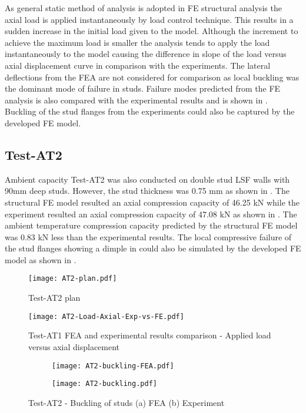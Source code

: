 As general static method of analysis is adopted in FE structural analysis the axial load is applied instantaneously by load control technique. This results in a sudden increase in the initial load given to the model. Although the increment to achieve the maximum load is smaller the analysis tends to apply the load instantaneously to the model causing the difference in slope of the load versus axial displacement curve in comparison with the experiments. The lateral deflections from the FEA are not considered for comparison as local buckling was the dominant mode of failure in studs. Failure modes predicted from the FE analysis is also compared with the experimental results and is shown in . Buckling of the stud flanges from the experiments could also be captured by the developed FE model.

\subsection*{Test-AT2}

Ambient capacity Test-AT2 was also conducted on double stud LSF walls with 90mm deep studs. However, the stud thickness was 0.75 mm as shown in . The structural FE model resulted an axial compression capacity of 46.25 kN while the experiment resulted an axial compression capacity of 47.08 kN as shown in . The ambient temperature compression capacity predicted by the structural FE model was 0.83 kN less than the experimental results. The local compressive failure of the stud flanges showing a dimple in  could also be simulated by the developed FE model as shown in . 
\begin{figure}[!htbp]
	\centering
			\texttt{[image: AT2-plan.pdf]}\\
		\caption{Test-AT2 plan}
		\label{fig:AT2-plan-fea}
\end{figure}
\begin{figure}[!htbp]
	\centering
			\texttt{[image: AT2-Load-Axial-Exp-vs-FE.pdf]}\\
		\caption{Test-AT1 FEA and experimental results comparison - Applied load versus axial displacement}
		\label{fig:AT2-fea-results}
\end{figure}
\begin{figure}[!htbp]
	\centering
	\begin{subfigure}[b]{0.4\textwidth}
		\centering
		\texttt{[image: AT2-buckling-FEA.pdf]}
		\caption{}
		\label{subfig:AT2-buckling-FEA}
	\end{subfigure}
	\begin{subfigure}[b]{0.4\textwidth}
		\centering
		\texttt{[image: AT2-buckling.pdf]}
		\caption{}
		\label{subfig:AT2-buckling-experiment}
	\end{subfigure}
	   \caption{Test-AT2 - Buckling of studs (a) FEA (b) Experiment}
	   \label{fig:AT2-buckling-fea-comparison}
\end{figure} 

